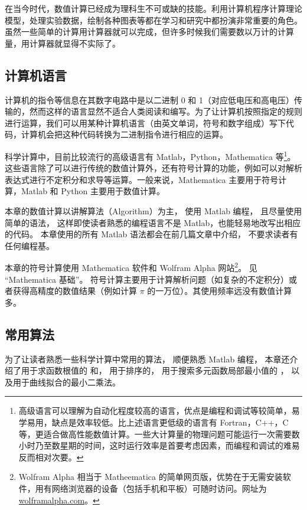 
在当今时代，数值计算已经成为理科生不可或缺的技能。利用计算机程序计算理论模型，处理实验数据，绘制各种图表等都在学习和研究中都扮演非常重要的角色。虽然一些简单的计算用计算器就可以完成，但许多时候我们需要数以万计的计算量，用计算器就显得不实际了。

\subsection{计算机语言}
计算机的指令等信息在其数字电路中是以二进制 0 和 1（对应低电压和高电压）传输的，然而这样的语言显然不适合人类阅读和编写。为了让计算机按照指定的规则进行运算，我们可以用某种计算机语言（由英文单词，符号和数字组成）写下代码，计算机会把这种代码转换为二进制指令进行相应的运算。

科学计算中，目前比较流行的高级语言有 Matlab，Python，Mathematica 等\footnote{高级语言可以理解为自动化程度较高的语言，优点是编程和调试等较简单，易学易用，缺点是效率较低。比上述语言更低级的语言有 Fortran，C++，C 等，更适合做高性能数值计算。一些大计算量的物理问题可能运行一次需要数小时乃至数星期的时间，这时运行效率是首要考虑因素，而编程和调试的难易反而相对次要。}。这些语言除了可以进行传统的数值计算外，还有符号计算的功能，例如可以对解析表达式进行不定积分和求导等运算。一般来说，Mathematica 主要用于符号计算，Matlab 和 Python 主要用于数值计算。

本章的数值计算以讲解算法（Algorithm）为主， 使用 Matlab 编程， 且尽量使用简单的语法， 这样即使读者熟悉的编程语言不是 Matlab，也能轻易地改写出相应的代码。 本章使用的所有 Matlab 语法都会在前几篇文章中介绍， 不要求读者有任何编程基。

本章的符号计算使用 Mathematica 软件和 Wolfram Alpha 网站\footnote{Wolfram Alpha 相当于 Matheematica 的简单网页版，优势在于无需安装软件，用有网络浏览器的设备（包括手机和平板）可随时访问。网址为 \href{https://www.wolframalpha.com/}{wolframalpha.com}。}。 见 “Mathematica 基础”。%
符号计算主要用于计算解析问题（如复杂的不定积分）或者获得高精度的数值结果（例如计算 $\pi$ 的一万位）。其使用频率远没有数值计算多。

\subsection{常用算法}
为了让读者熟悉一些科学计算中常用的算法， 顺便熟悉 Matlab 编程， 本章还介绍了用于求函数根值的 和， 用于排序的， 用于搜索多元函数局部最小值的 ， 以及用于曲线拟合的最小二乘法。%

